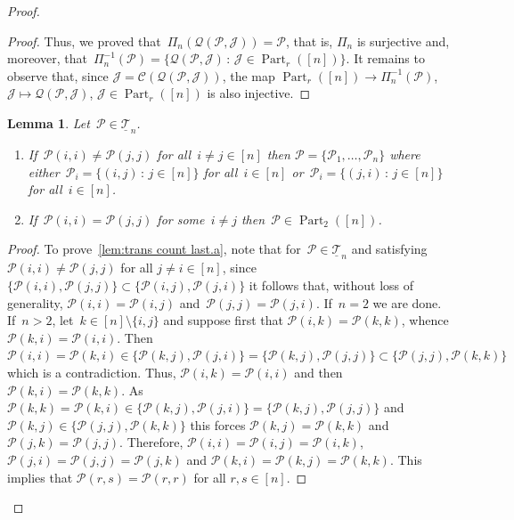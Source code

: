 \documentclass[12pt, reqno]{amsart}
\newtheorem{lemma}[theorem]{Lemma}
\theoremstyle{definition}
\numberwithin{equation}{section}
\newenvironment{enumalph}{\begin{enumerate}[label={\rm(\alph*)},leftmargin=*]}{\end{enumerate}}
\DeclareMathOperator{\Part}{Part}
\begin{document}
\begin{proof}
\begin{proof}
Thus, we proved that~$\Pi_n(\mathcal Q(\mathcal P,\mathcal J))=
\mathcal P$, that is, $\Pi_n$ is surjective and, moreover,
that~$\Pi^{-1}_n(\mathcal P)=\{ \mathcal Q(\mathcal P,\mathcal J)\,:\,
\mathcal J\in \Part_r([n])\}$. It remains to observe that,
since $\mathcal J=\mathcal C(\mathcal Q(\mathcal P,\mathcal J))$,
the map $\Part_r([n])\to \Pi_n^{-1}(\mathcal P)$, $\mathcal J\mapsto 
\mathcal Q(\mathcal P,\mathcal J)$, $\mathcal J\in\Part_r([n])$
is also injective.
\end{proof}
\begin{lemma}\label{lem:trans count last}
Let~$\mathcal P\in \underline{\mathscr T}_n$.
\begin{enumalph}
\item\label{lem:trans count last.a} If~$\mathcal P(i,i)\not=\mathcal P(j,j)$ for all~$i\not=j\in[n]$
then $\mathcal P=\{ \mathcal P_1,\dots,\mathcal P_n\}$ where 
either~$\mathcal P_i=\{ (i,j)\,:\, j\in[n]\}$ for all~$i\in [n]$
or~$\mathcal P_i=\{ (j,i)\,:\, j\in [n]\}$ for all~$i\in[n]$.

\item\label{lem:trans count last.b} If~$\mathcal P(i,i)=\mathcal P(j,j)$ for some~$i\not=j$ then~$\mathcal P\in \Part_2([n])$. 
\end{enumalph}
\end{lemma}
\begin{proof}
To prove~\ref{lem:trans count last.a}, 
note that for~$\mathcal P\in\underline{\mathscr T}_n$
and satisfying~$\mathcal P(i,i)\not=\mathcal P(j,j)$ for all $j\not=i\in[n]$, since
$\{\mathcal P(i,i),\mathcal P(j,j)\}\subset \{\mathcal P(i,j),\mathcal P(j,i)\}$
it follows that, without loss of generality, 
$\mathcal P(i,i)=\mathcal P(i,j)$ and~$\mathcal P(j,j)=\mathcal P(j,i)$.
If~$n=2$ we are done. If~$n>2$, let~$k\in[n]\setminus\{i,j\}$
and suppose first that $\mathcal P(i,k)=\mathcal P(k,k)$, whence $\mathcal P(k,i)=\mathcal P(i,i)$. Then $\mathcal P(i,i)=\mathcal P(k,i)\in
\{\mathcal P(k,j),\mathcal P(j,i)\}=\{\mathcal P(k,j),\mathcal P(j,j)\}
\subset \{\mathcal P(j,j),\mathcal P(k,k)\}$ which is a contradiction. Thus,
$\mathcal P(i,k)=\mathcal P(i,i)$ and then $\mathcal P(k,i)=\mathcal P(k,k)$. As $\mathcal P(k,k)=\mathcal P(k,i)\in\{\mathcal P(k,j),\mathcal P(j,i)\}
=\{\mathcal P(k,j),\mathcal P(j,j)\}$ and $\mathcal P(k,j)\in\{\mathcal P(j,j),\mathcal P(k,k)\}$ this forces $\mathcal P(k,j)=\mathcal P(k,k)$ and $\mathcal P(j,k)=\mathcal P(j,j)$.
Therefore, $\mathcal P(i,i)=\mathcal P(i,j)=\mathcal P(i,k)$, $\mathcal P(j,i)=\mathcal P(j,j)=\mathcal P(j,k)$ and $\mathcal P(k,i)=\mathcal P(k,j)=\mathcal P(k,k)$.
This implies that $\mathcal P(r,s)=\mathcal P(r,r)$ for all $r,s\in[n]$. 


\end{proof}
\end{proof}
\end{document}
